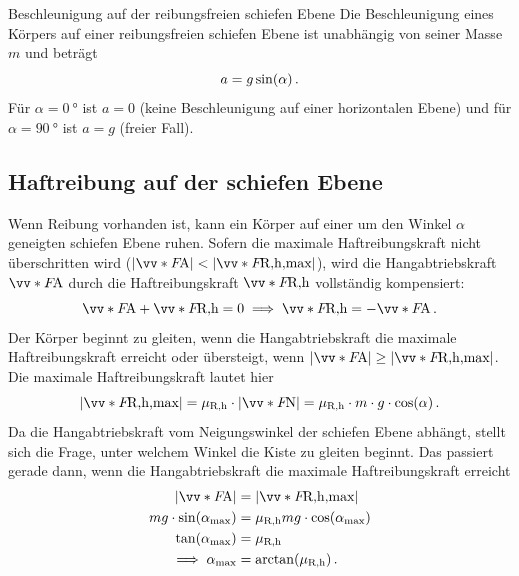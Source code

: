\begin{rememberbox}[]{Beschleunigung auf der reibungsfreien schiefen Ebene}
Die Beschleunigung eines Körpers auf einer reibungsfreien schiefen Ebene ist unabhängig von seiner Masse $m$ und beträgt
\begin{equation}\label{eq: beschleunigung_reibungsfreies_gleiten}
    a = g \sin(\alpha) \,.
\end{equation}
Für $\alpha = \SI{0}{\degree}$ ist $a=0$ (keine Beschleunigung auf einer horizontalen Ebene) und für $\alpha = \SI{90}{\degree}$ ist $a = g$ (freier Fall).
\end{rememberbox}

\subsection{Haftreibung auf der schiefen Ebene}\label{subsec: haftreibung_schiefe_ebene}
Wenn Reibung vorhanden ist, kann ein Körper auf einer um den Winkel $\alpha$ geneigten schiefen Ebene ruhen. Sofern die maximale Haftreibungskraft nicht überschritten wird ($|\ivecS{F}{\text{A}}| < |\ivecS{F}{\text{R,h,max}}|$), wird die Hangabtriebskraft $\ivecS{F}{\text{A}}$ durch die Haftreibungskraft $\ivecS{F}{\text{R,h}}$ vollständig kompensiert: 
\begin{equation}
    \ivecS{F}{\text{A}} + \ivecS{F}{\text{R,h}} = 0 \implies \ivecS{F}{\text{R,h}} = -\ivecS{F}{\text{A}} \mDot
\end{equation}
Der Körper beginnt zu gleiten, wenn die Hangabtriebskraft die maximale Haftreibungskraft erreicht oder übersteigt, \gDh wenn $|\ivecS{F}{\text{A}}| \geq |\ivecS{F}{\text{R,h,max}}|$. Die maximale Haftreibungskraft lautet hier 
\begin{equation}
    |\ivecS{F}{\text{R,h,max}}| = \mu_{\text{R,h}} \cdot |\ivecS{F}{\text{N}}| = \mu_{\text{R,h}}\cdot m\cdot g\cdot \cos(\alpha) \mDot
\end{equation}
Da die Hangabtriebskraft vom Neigungswinkel der schiefen Ebene abhängt, stellt sich die Frage, unter welchem Winkel die Kiste zu gleiten beginnt. Das passiert gerade dann, wenn die Hangabtriebskraft die maximale Haftreibungskraft erreicht
\begin{equation}\begin{aligned}
     |\ivecS{F}{\text{A}}| &= |\ivecS{F}{\text{R,h,max}}| \\
    mg\cdot \sin(\alpha_{\maxText}) &= \mu_{\text{R,h}} mg \cdot\cos(\alpha_{\maxText}) \\
    \tan(\alpha_{\maxText}) &= \mu_{\text{R,h}} \\
    \implies \alpha_{\maxText} &= \arctan(\mu_{\text{R,h}})\mDot
\end{aligned}\end{equation}
